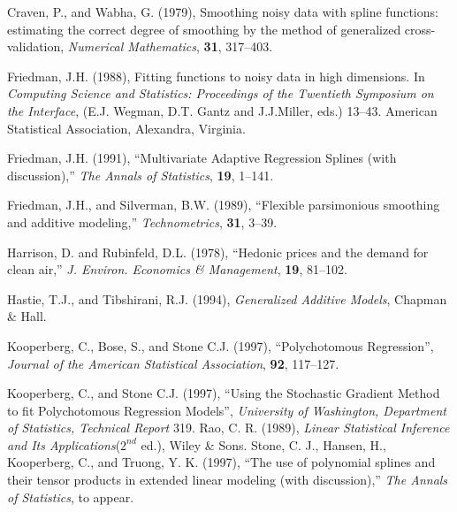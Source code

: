 \begin{thebibliography}{99}

Craven, P., and Wabha, G. (1979),
Smoothing noisy data with spline functions: estimating the
correct degree of smoothing by the method of generalized
cross-validation,
{\em Numerical Mathematics}, {\bf 31}, 317--403.

Friedman, J.H. (1988),
Fitting functions to noisy data in high dimensions. In
{\em Computing Science and Statistics: Proceedings of the Twentieth
Symposium on the Interface}, (E.J. Wegman, D.T. Gantz and J.J.Miller,
eds.) 13--43. American Statistical Association, Alexandra, Virginia.

Friedman, J.H. (1991),
``Multivariate Adaptive Regression Splines (with discussion),''
{\em The Annals of Statistics}, {\bf 19}, 1--141.


Friedman, J.H., and Silverman, B.W. (1989),
``Flexible parsimonious smoothing and additive modeling,''
{\em Technometrics}, {\bf 31}, 3--39.

Harrison, D. and Rubinfeld, D.L. (1978),
``Hedonic prices and the demand for clean air,''
{\em J. Environ. Economics \& Management}, {\bf 19}, 81--102.

Hastie, T.J., and Tibshirani, R.J. (1994),
{\em Generalized Additive Models},
Chapman \& Hall.

Kooperberg, C., Bose, S., and Stone C.J. (1997),
``Polychotomous Regression'',
{\em Journal of the American Statistical Association}, {\bf 92}, 117--127.

Kooperberg, C., and Stone C.J. (1997),
``Using the Stochastic Gradient Method to fit Polychotomous Regression
Models'',
{\em University of Washington, Department of Statistics, Technical Report} 319.
Rao, C. R. (1989),
{\em Linear Statistical Inference and Its Applications}($2^{nd}$ ed.), 
Wiley \& Sons.
Stone, C. J., Hansen, H., Kooperberg, C., and Truong, Y. K. (1997),
``The use of polynomial splines and their tensor products in extended linear
modeling (with discussion),''
{\em The Annals of Statistics}, to appear.


\end{thebibliography}


